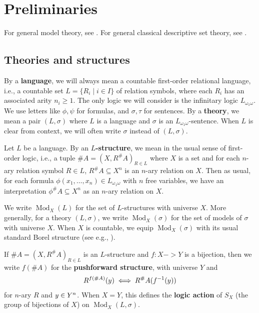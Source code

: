 \documentclass[11pt]{article}
\newcommand*\defn{\textbf}
\DeclareMathOperator\Mod{Mod}
\begin{document}
\section{Preliminaries}
\label{sec:prelims}

For general model theory, see \cite{Hod}.  For general classical descriptive set theory, see \cite{Kcdst}.

\subsection{Theories and structures}
\label{sec:theories-struct}

By a \defn{language}, we will always mean a countable first-order relational language, i.e., a countable set $L = \{R_i \mid i \in I\}$ of relation symbols, where each $R_i$ has an associated arity $n_i \ge 1$.  The only logic we will consider is the infinitary logic $L_{\omega_1\omega}$.  We use letters like $\phi, \psi$ for formulas, and $\sigma, \tau$ for sentences.  By a \defn{theory}, we mean a pair $(L, \sigma)$ where $L$ is a language and $\sigma$ is an $L_{\omega_1\omega}$-sentence.  When $L$ is clear from context, we will often write $\sigma$ instead of $(L, \sigma)$.

Let $L$ be a language.  By an \defn{$L$-structure}, we mean in the usual sense of first-order logic, i.e., a tuple $\#A = (X, R^\#A)_{R \in L}$ where $X$ is a set and for each $n$-ary relation symbol $R \in L$, $R^\#A \subseteq X^n$ is an $n$-ary relation on $X$.  Then as usual, for each formula $\phi(x_1, \dotsc, x_n) \in L_{\omega_1\omega}$ with $n$ free variables, we have an interpretation $\phi^\#A \subseteq X^n$ as an $n$-ary relation on $X$.

We write $\Mod_X(L)$ for the set of $L$-structures with universe $X$.  More generally, for a theory $(L, \sigma)$, we write $\Mod_X(\sigma)$ for the set of models of $\sigma$ with universe $X$.  When $X$ is countable, we equip $\Mod_X(\sigma)$ with its usual standard Borel structure (see e.g., \cite[16.C]{Kcdst}).

If $\#A = (X, R^\#A)_{R \in L}$ is an $L$-structure and $f : X -> Y$ is a bijection, then we write $f(\#A)$ for the \defn{pushforward structure}, with universe $Y$ and
\begin{align*}
R^{f(\#A)}(\-y) \iff R^\#A(f^{-1}(\-y))
\end{align*}
for $n$-ary $R$ and $\-y \in Y^n$.  When $X = Y$, this defines the \defn{logic action} of $S_X$ (the group of bijections of $X$) on $\Mod_X(L, \sigma)$.
\end{document}
